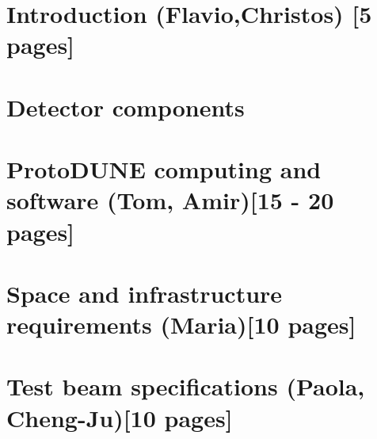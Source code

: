 \ifdefined\isfinal\documentclass[final]{pd-tdr}\else\documentclass{pd-tdr}\fi
\begin{document}






\chapter{Introduction {\color{red} (Flavio,Christos) [5 pages]}}


%

%

\chapter{Detector components} %


\chapter{ProtoDUNE computing and software {\color{red} (Tom, Amir)[15 - 20 pages]}}


\chapter{Space and infrastructure requirements {\color{red} (Maria)[10 pages]}}


\chapter{Test beam specifications {\color{red} (Paola, Cheng-Ju)[10 pages]}} 


%
\end{document}
